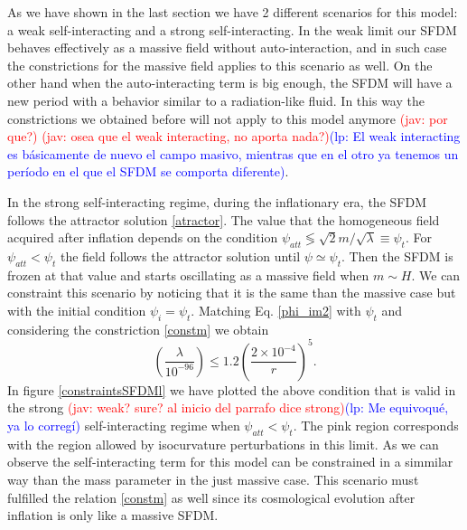 \documentclass[amssymb,twocolumn,prd,nofootinbib,showpacs]{revtex4-1}
\newcommand{\jav}[1]{\textcolor{red}{(jav: #1)}}
\newcommand{\lp}[1]{\textcolor{blue}{(lp: #1)}}
\begin{document}
As we have shown in the last section we have 2 different scenarios for this model: 
a weak self-interacting and a strong self-interacting. In the weak limit our SFDM behaves 
effectively as a massive field without auto-interaction, and in such case the constrictions 
for the massive field applies to this scenario as well. On the other hand when the auto-interacting 
term is big enough, the SFDM will have a new period with a behavior similar to a radiation-like fluid. 
In this way the constrictions we obtained before will not apply to this model anymore \jav{por que?}
\jav{osea que el weak interacting, no aporta nada?}\lp{El weak interacting es b\'asicamente de nuevo el campo masivo, mientras que en el otro ya tenemos un per\'iodo en el que el SFDM se comporta diferente}.


In the strong self-interacting regime, during the inflationary era, the SFDM follows the attractor solution \eqref{atractor}.
The value that the homogeneous field acquired  after inflation depends on the condition 
$\psi_{att}\lessgtr \sqrt{2}m/\sqrt{\lambda}\equiv \psi_t$. 
For $\psi_{att}<\psi_t$ the field follows the attractor solution until $\psi\simeq \psi_t$. 
Then the SFDM is frozen at that value and starts oscillating as a massive field 
when $m\sim H$. We can constraint this scenario by noticing that it is the same than the massive case but with the initial condition $\psi_i=\psi_t$.  Matching Eq. \eqref{phi_im2} with $\psi_t$ and considering the constriction \eqref{constm} we obtain
%
\begin{equation}
\left(\frac{\lambda}{10^{-96}}\right)\leq 1.2\left(\frac{2\times 10^{-4}}{r}\right)^5.
\end{equation}
In figure \ref{constraintsSFDMl} we have plotted the above condition that is valid in the strong \jav{weak? sure? al inicio del parrafo dice strong}\lp{Me equivoqu\'e, ya lo correg\'i} self-interacting regime when $\psi_{att}<\psi_t$. The  pink  region corresponds with the region allowed by isocurvature perturbations in this limit.  As we can observe the self-interacting term for this model can be constrained in a simmilar way than the mass parameter in the just massive case. This scenario must fulfilled the relation \eqref{constm} as well since its cosmological evolution after inflation is only like a massive SFDM.
\end{document}
